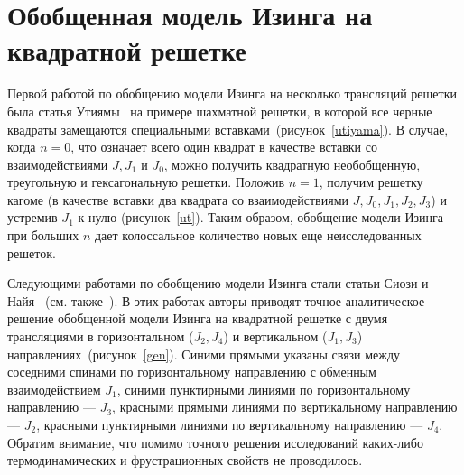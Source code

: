 \chapter{Обобщенная модель Изинга на квадратной решетке}\label{ch:ch4}

Первой работой по обобщению модели Изинга на несколько трансляций решетки была статья Утиямы~\cite{utiyama1951} на примере шахматной решетки, в которой все черные квадраты замещаются специальными вставками~(рисунок~\ref{utiyama}). В случае, когда $n=0$, что означает всего один квадрат в качестве вставки со взаимодействиями $J, J_1$ и $J_0$, можно получить квадратную необобщенную, треугольную и гексагональную решетки. Положив $n=1$, получим решетку кагоме (в качестве вставки два квадрата со взаимодействиями $J, J_0, J_1, J_2, J_3$) и устремив $J_1$ к нулю (рисунок~\ref{ut}). Таким образом, обобщение модели Изинга при больших $n$ дает колоссальное количество новых еще неисследованных решеток.



Следующими работами по обобщению модели Изинга стали статьи Сиози и Найя~\cite{syozi1960} (см. также~\cite{siozi_domb1972}). В этих работах авторы приводят точное аналитическое решение обобщенной модели Изинга на квадратной решетке с двумя трансляциями в горизонтальном ($J_{2}, J_{4}$) и вертикальном ($J_{1}, J_{3}$) направлениях~(рисунок~\ref{gen}). Синими прямыми указаны связи между соседними спинами по горизонтальному направлению с обменным взаимодействием $J_1$, синими пунктирными линиями по горизонтальному направлению  --- $J_3$, красными прямыми линиями по вертикальному направлению --- $J_2$, красными пунктирными линиями по вертикальному направлению --- $J_4$. Обратим внимание, что помимо точного решения исследований каких-либо термодинамических и фрустрационных свойств не проводилось.

